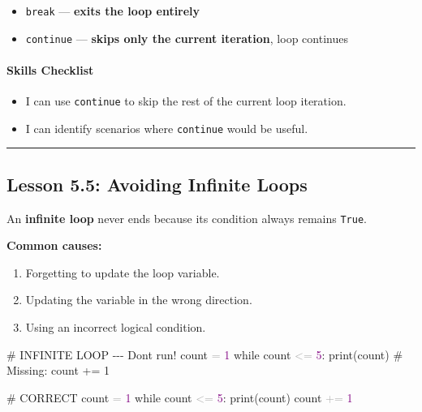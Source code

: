 \documentclass[
  justified,
  openright,
]{tufte-book}
\let\subsubsection\paragraph
\let\paragraph\paragraph
\newcommand{\BuiltInTok}[1]{#1}
\newcommand{\CommentTok}[1]{\textcolor{MidGray}{#1}}
\newcommand{\ControlFlowTok}[1]{\textcolor{BrandBlue}{#1}}
\newcommand{\DecValTok}[1]{\textcolor{Purple}{#1}}
\newcommand{\NormalTok}[1]{#1}
\newcommand{\OperatorTok}[1]{\textcolor{DarkGray}{#1}}
\newenvironment{Shaded}{%
  \begin{snugshade}
}{%
  \end{snugshade}
}
\let\subsubsection\paragraph
\let\paragraph\paragraph
\providecommand{\tightlist}{%
  \setlength{\itemsep}{0pt}\setlength{\parskip}{0pt}}
\begin{document}
\begin{itemize}
\tightlist
\item
  \texttt{break} --- \textbf{exits the loop entirely}
\item
  \texttt{continue} --- \textbf{skips only the current iteration}, loop
  continues
\end{itemize}

\subsubsection{Skills Checklist}\label{skills-checklist-25}

\begin{itemize}
\tightlist
\item[$\square$]
  I can use \texttt{continue} to skip the rest of the current loop
  iteration.
\item[$\square$]
  I can identify scenarios where \texttt{continue} would be useful.
\end{itemize}

\begin{center}\rule{0.5\linewidth}{0.5pt}\end{center}

\subsection{Lesson 5.5: Avoiding Infinite
Loops}\label{lesson-5.5-avoiding-infinite-loops}

An \textbf{infinite loop} never ends because its condition always
remains \texttt{True}.

\textbf{Common causes:}

\begin{enumerate}
\def\labelenumi{\arabic{enumi}.}
\tightlist
\item
  Forgetting to update the loop variable.
\item
  Updating the variable in the wrong direction.
\item
  Using an incorrect logical condition.
\end{enumerate}

\begin{Shaded}
\begin{Highlighting}[]
\CommentTok{\# INFINITE LOOP {-}{-}{-} Don\textquotesingle{}t run!}
\NormalTok{count }\OperatorTok{=} \DecValTok{1}
\ControlFlowTok{while}\NormalTok{ count }\OperatorTok{\textless{}=} \DecValTok{5}\NormalTok{:}
    \BuiltInTok{print}\NormalTok{(count)}
    \CommentTok{\# Missing: count += 1}

\CommentTok{\# CORRECT}
\NormalTok{count }\OperatorTok{=} \DecValTok{1}
\ControlFlowTok{while}\NormalTok{ count }\OperatorTok{\textless{}=} \DecValTok{5}\NormalTok{:}
    \BuiltInTok{print}\NormalTok{(count)}
\NormalTok{    count }\OperatorTok{+=} \DecValTok{1}
\end{Highlighting}
\end{Shaded}
\end{document}
